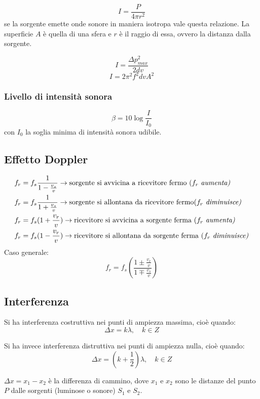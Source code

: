 \documentclass[12pt]{article}
\begin{document}
$$ I = \frac{P}{4\pi r^2} $$
se la sorgente emette onde sonore in maniera isotropa vale questa relazione. La superficie $A$ è quella di una sfera e $r$ è il raggio di essa, ovvero la distanza dalla sorgente.

\vspace{1em}

$$ I = \frac{\Delta p_{max}^2}{2dv} $$
$$ I = 2\pi^2 f^2 dvA^2 $$

\subsubsection{Livello di intensità sonora}
$$ \beta = 10 \log\frac{I}{I_0} $$
con $I_0$ la soglia minima di intensità sonora udibile.

\subsection{Effetto Doppler}
\begin{align*}
f_r &= f_s \frac{1}{1 - \frac{v_s}{v}} \rightarrow \text{sorgente si avvicina a ricevitore fermo ($f_r$ \textit{aumenta)}} \\
f_r &= f_s \frac{1}{1 + \frac{v_s}{v}} \rightarrow \text{sorgente si allontana da ricevitore fermo($f_r$ \textit{diminuisce)}} \\
f_r &= f_s(1 + \frac{v_r}{v}) \rightarrow \text{ricevitore si avvicina a sorgente ferma ($f_r$ \textit{aumenta)}} \\
f_r &= f_s(1 - \frac{v_r}{v}) \rightarrow \text{ricevitore si allontana da sorgente ferma ($f_r$ \textit{diminuisce)}}
\end{align*}
Caso generale:
$$ f_r = f_s\left(\frac{1 \pm \frac{v_r}{v}}{1 \mp \frac{v_s}{v}}\right) $$

\subsection{Interferenza}
Si ha interferenza costruttiva nei punti di ampiezza massima, cioè quando:
$$ \Delta x = k\lambda, \hspace{1em} k \in Z $$

\vspace{1em}

Si ha invece interferenza distruttiva nei punti di ampiezza nulla, cioè quando:
$$ \Delta x = (k+\frac{1}{2})\lambda, \hspace{1em} k \in Z $$

$\Delta x = x_1-x_2$ è la differenza di cammino, dove $x_1$ e $x_2$ sono le distanze del punto $P$ dalle sorgenti (luminose o sonore) $S_1$ e $S_2$.
\end{document}

